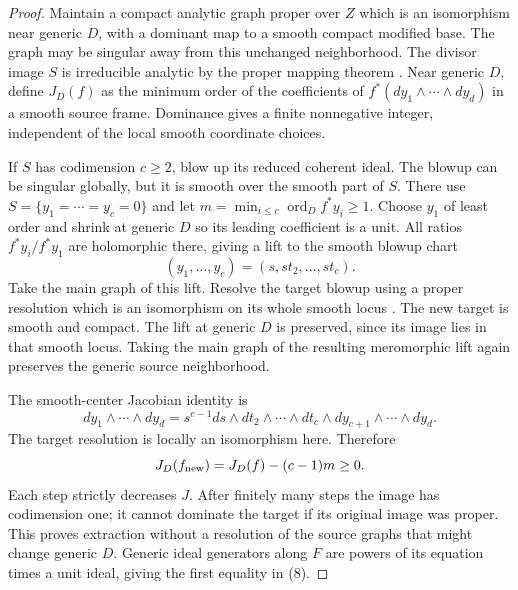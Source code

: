 \documentclass[11pt]{article}
\newcommand{\ord}{\operatorname{ord}}
\theoremstyle{remark}\newtheorem{remark}[theorem]{Remark}
\begin{document}
\begin{proof}
Maintain a compact analytic graph proper over $Z$ which is an
isomorphism near generic $D$, with a dominant map to a smooth
compact modified base. The graph may be singular away from this
unchanged neighborhood. The divisor image $S$ is irreducible
analytic by the proper mapping theorem
\cite[Chapter II, Theorem 8.8]{Dem}.
Near generic $D$, define $J_D(f)$ as the minimum order of the
coefficients of $f^*(dy_1\wedge\cdots\wedge dy_d)$ in a smooth
source frame. Dominance gives a finite nonnegative integer,
independent of the local smooth coordinate choices.

If $S$ has codimension $c\ge2$, blow up its reduced coherent ideal.
The blowup can be singular globally, but it is smooth over the
smooth part of $S$. There use $S=\{y_1=\cdots=y_c=0\}$ and let
$m=\min_{i\le c}\ord_D f^*y_i\ge1$.
Choose $y_1$ of least order and shrink at generic $D$ so its
leading coefficient is a unit. All ratios $f^*y_i/f^*y_1$ are
holomorphic there, giving a lift to the smooth blowup chart
\[
 (y_1,\ldots,y_c)=(s,st_2,\ldots,st_c).
\]
Take the main graph of this lift. Resolve the target blowup using
a proper resolution which is an isomorphism on its whole smooth
locus \cite[Theorem 2.0.1]{Wlo}. The new target is smooth and
compact. The lift at generic $D$ is preserved, since its image
lies in that smooth locus. Taking the main graph of the resulting
meromorphic lift again preserves the generic source neighborhood.

The smooth-center Jacobian identity is
\[
 dy_1\wedge\cdots\wedge dy_d
   =s^{c-1}ds\wedge dt_2\wedge\cdots\wedge dt_c
                  \wedge dy_{c+1}\wedge\cdots\wedge dy_d.
\]
The target resolution is locally an isomorphism here. Therefore
\[
 J_D(f_{\rm new})=J_D(f)-(c-1)m\ge0.
\]
Each step strictly decreases $J$. After finitely many steps the
image has codimension one; it cannot dominate the target if its
original image was proper. This proves extraction without a
resolution of the source graphs that might change generic $D$.
Generic ideal generators along $F$ are powers of its equation
times a unit ideal, giving the first equality in (8).


\end{proof}
\end{document}
